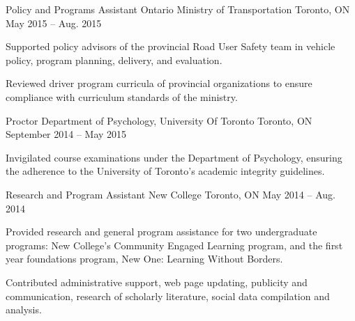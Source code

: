 \begin{cventries}
  \cventry
    {Policy and Programs Assistant } %
    {Ontario Ministry of Transportation } %
    {Toronto, ON} %
    {May 2015 – Aug. 2015} %
    {
      \begin{cvitems} %
        \item {Supported policy advisors of the provincial Road User Safety team in vehicle policy, program planning, delivery, and evaluation.}
        \item {Reviewed driver program curricula of provincial organizations to ensure compliance with curriculum standards of the ministry.}
      \end{cvitems}
    }
    
  \cventry
    {Proctor } %
    {Department of Psychology, University Of Toronto } %
    {Toronto, ON} %
    {September 2014 – May 2015} %
    {
      \begin{cvitems} %
        \item {Invigilated course examinations under the Department of Psychology, ensuring the adherence to the University of Toronto's academic integrity guidelines. }
      \end{cvitems}
    }
  \cventry
    {Research and Program Assistant} %
    {New College} %
    {Toronto, ON} %
    {May 2014 – Aug. 2014} %
    {
      \begin{cvitems} %
        \item {Provided research and general program assistance for two undergraduate programs: New College’s Community Engaged Learning program, and the first year foundations program, New One: Learning Without Borders.}
        \item {Contributed administrative support, web page updating, publicity and communication, research of scholarly literature, social data compilation and analysis. }
      \end{cvitems}
    }
    
  
\end{cventries}
